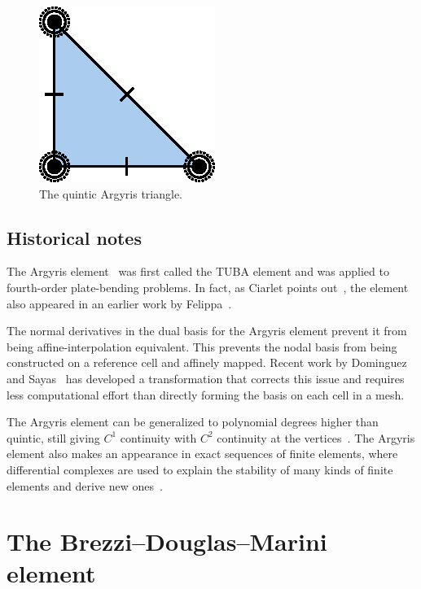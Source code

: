 \begin{figure}[H]
  \begin{center}
    \includegraphics[width=\elementwidth]{chapters/kirby-6/eps/ARG5.eps}
    \caption{The quintic Argyris triangle.}
  \end{center}
\end{figure}

\subsection{Historical notes}

The Argyris element~\cite{ArgyrisFriedEtAl1968} was first called the
TUBA element and was applied to fourth-order plate-bending problems.
In fact, as Ciarlet points out~\cite{Ciarlet2002}, the element also
appeared in an earlier work by Felippa~\cite{Felippa1966}.

The normal derivatives in the dual basis for the Argyris element
prevent it from being affine-interpolation equivalent. This prevents
the nodal basis from being constructed on a reference cell and
affinely mapped. Recent work by Dominguez and
Sayas~\cite{DominguezSayas2008} has developed a transformation that
corrects this issue and requires less computational effort than
directly forming the basis on each cell in a mesh.

The Argyris element can be generalized to polynomial degrees higher
than quintic, still giving \( C^1 \) continuity with \( C^2 \)
continuity at the vertices~\cite{SolinSegethEtAl2004}. The Argyris
element also makes an appearance in exact sequences of finite
elements, where differential complexes are used to explain the
stability of many kinds of finite elements and derive new
ones~\cite{ArnoldFalkEtAl2006}.

\newpage

\section{The Brezzi--Douglas--Marini element}

